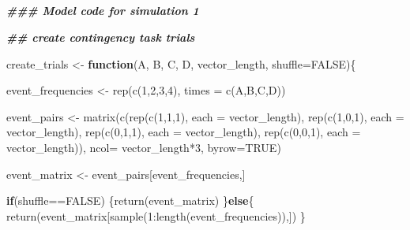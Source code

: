 \documentclass[
  english,
  man,floatsintext]{apa6}
\newenvironment{Shaded}{\begin{snugshade}}{\end{snugshade}}
\newcommand{\DecValTok}[1]{\textcolor[rgb]{0.00,0.00,0.81}{#1}}
\newcommand{\ConstantTok}[1]{\textcolor[rgb]{0.00,0.00,0.00}{#1}}
\newcommand{\SpecialCharTok}[1]{\textcolor[rgb]{0.00,0.00,0.00}{#1}}
\newcommand{\DocumentationTok}[1]{\textcolor[rgb]{0.56,0.35,0.01}{\textbf{\textit{#1}}}}
\newcommand{\OtherTok}[1]{\textcolor[rgb]{0.56,0.35,0.01}{#1}}
\newcommand{\FunctionTok}[1]{\textcolor[rgb]{0.00,0.00,0.00}{#1}}
\newcommand{\ControlFlowTok}[1]{\textcolor[rgb]{0.13,0.29,0.53}{\textbf{#1}}}
\newcommand{\AttributeTok}[1]{\textcolor[rgb]{0.77,0.63,0.00}{#1}}
\newcommand{\NormalTok}[1]{#1}
\begin{document}
\begin{appendix}
\section{}
\singlespacing

\begin{Shaded}
\begin{Highlighting}[]
\DocumentationTok{\#\#\# Model code for simulation 1}

\DocumentationTok{\#\# create contingency task trials}

\NormalTok{create\_trials }\OtherTok{\textless{}{-}} \ControlFlowTok{function}\NormalTok{(A, B, C, D, vector\_length, }\AttributeTok{shuffle=}\ConstantTok{FALSE}\NormalTok{)\{}

\NormalTok{  event\_frequencies }\OtherTok{\textless{}{-}} \FunctionTok{rep}\NormalTok{(}\FunctionTok{c}\NormalTok{(}\DecValTok{1}\NormalTok{,}\DecValTok{2}\NormalTok{,}\DecValTok{3}\NormalTok{,}\DecValTok{4}\NormalTok{), }\AttributeTok{times =} \FunctionTok{c}\NormalTok{(A,B,C,D))}

\NormalTok{  event\_pairs }\OtherTok{\textless{}{-}} \FunctionTok{matrix}\NormalTok{(}\FunctionTok{c}\NormalTok{(}\FunctionTok{rep}\NormalTok{(}\FunctionTok{c}\NormalTok{(}\DecValTok{1}\NormalTok{,}\DecValTok{1}\NormalTok{,}\DecValTok{1}\NormalTok{), }\AttributeTok{each =}\NormalTok{ vector\_length),}
\FunctionTok{rep}\NormalTok{(}\FunctionTok{c}\NormalTok{(}\DecValTok{1}\NormalTok{,}\DecValTok{0}\NormalTok{,}\DecValTok{1}\NormalTok{), }\AttributeTok{each =}\NormalTok{ vector\_length),}
\FunctionTok{rep}\NormalTok{(}\FunctionTok{c}\NormalTok{(}\DecValTok{0}\NormalTok{,}\DecValTok{1}\NormalTok{,}\DecValTok{1}\NormalTok{), }\AttributeTok{each =}\NormalTok{ vector\_length),}
\FunctionTok{rep}\NormalTok{(}\FunctionTok{c}\NormalTok{(}\DecValTok{0}\NormalTok{,}\DecValTok{0}\NormalTok{,}\DecValTok{1}\NormalTok{), }\AttributeTok{each =}\NormalTok{ vector\_length)),}
\AttributeTok{ncol=}\NormalTok{ vector\_length}\SpecialCharTok{*}\DecValTok{3}\NormalTok{,}
\AttributeTok{byrow=}\ConstantTok{TRUE}\NormalTok{)}

\NormalTok{  event\_matrix }\OtherTok{\textless{}{-}}\NormalTok{ event\_pairs[event\_frequencies,]}

\ControlFlowTok{if}\NormalTok{(shuffle}\SpecialCharTok{==}\ConstantTok{FALSE}\NormalTok{) \{}\FunctionTok{return}\NormalTok{(event\_matrix)}
\NormalTok{    \}}\ControlFlowTok{else}\NormalTok{\{}
\FunctionTok{return}\NormalTok{(event\_matrix[}\FunctionTok{sample}\NormalTok{(}\DecValTok{1}\SpecialCharTok{:}\FunctionTok{length}\NormalTok{(event\_frequencies)),])}
\NormalTok{    \}}


\end{Highlighting}
\end{Shaded}
\end{appendix}
\end{document}
